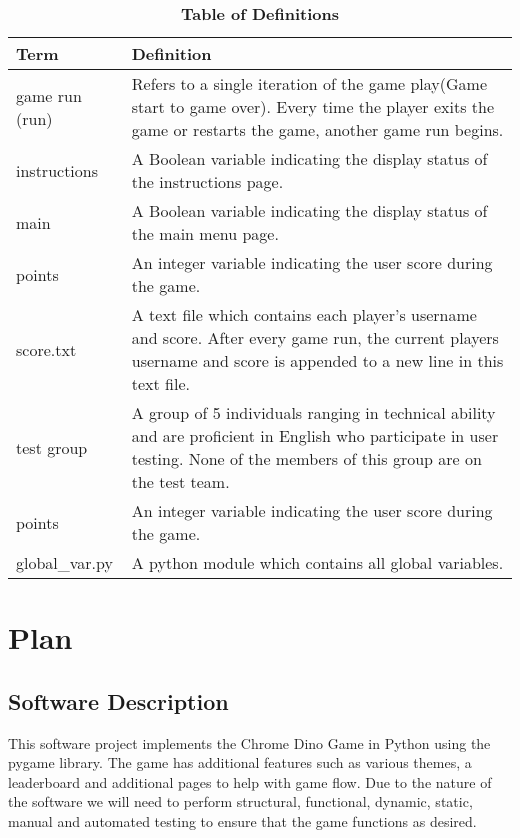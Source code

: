 \documentclass[12pt, titlepage]{article}
\begin{document}
	\begin{table}[H]
		\caption{\textbf{Table of Definitions}} \label{Table}
		
		\begin{tabularx}{\textwidth}{p{3cm}X}
			\toprule
			\textbf{Term} & \textbf{Definition}\\
			\midrule
			
			game run (run) & Refers to a single iteration of the game play(Game start to game over). Every time the player exits the game or restarts the game, another game run begins.\\
			
			instructions & A Boolean variable indicating the display status of the instructions page.\\
			
			main & A Boolean variable indicating the display status of the main menu page. \\
			
			points & An integer variable indicating the user score during the game. \\
			
			score.txt & A text file which contains each player's username and score. After every game run, the current players username and score is appended to a new line in this text file.\\
			
			test group & A group of 5 individuals ranging in technical ability and are proficient in English who participate in user testing. None of the members of this group are on the test team.  \\
			
			points & An integer variable indicating the user score during the game. \\
			
			global_var.py & A python module which contains all global variables. \\
			
			\bottomrule
		\end{tabularx}
		
	\end{table}	
	
	
	\section{Plan}
	
	\subsection{Software Description}
	This software project implements the Chrome Dino Game in Python using the pygame library. The game has additional features such as various themes, a leaderboard and additional pages to help with game flow. Due to the nature of the software we will need to perform structural, functional, dynamic, static, manual and automated testing to ensure that the game functions as desired. 
	
\end{document}

